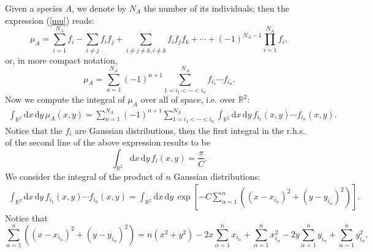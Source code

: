 \documentclass[12pt]{article}
\newcommand{\xd}{\mathrm{d}}
\numberwithin{equation}{section} %
\numberwithin{figure}{section} %
\theoremstyle{definition}
\begin{document}
Given a species $A$, we denote by $N_A$ the number of its individuals; then the expression (\ref{mu}) reads:
\begin{equation}
\mu_A = \sum_{i=1}^{N_A} f_{i} - \sum_{i \neq j} f_{i} f_{j} + \sum_{i \neq j \neq k,  i \neq k } f_{i} f_{j} f_{k} + \cdots + (-1)^{N_A-1} \prod_{i=1}^{N_A} f_i,
\end{equation}
or, in more compact notation,
\begin{equation}
\mu_A = \sum_{n=1}^{N_A} (-1)^{n+1} \sum_{ 1=i_1< \cdots <i_n }^{N_A} f_{i_1} \cdots f_{i_n}.
\end{equation}
Now we compute the integral of $\mu_A$ over all of space, i.e. over ${\mathbb R}^2$:
\begin{align}
\int_{{\mathbb R}^2} \xd x \, \xd y \, \mu_A(x,y)
= \sum_{n=1}^{N_A} (-1)^{n+1} \sum_{ 1=i_1< \cdots <i_n }^{N_A} \int_{{\mathbb R}^2} \xd x \, \xd y \,  f_{i_1} (x,y)\cdots f_{i_n} (x,y).
\end{align}
Notice that the $f_i$ are Gaussian distributions, then the first integral in the r.h.s. of the second line of the above expression results to be
\begin{equation}
\int_{{\mathbb R}^2} \xd x \, \xd y \, f_{i}(x,y) = \frac{\pi}{C}.
\end{equation}
We consider the integral of the product of $n$ Gaussian distributions:
\begin{align}
\int_{{\mathbb R}^2} \xd x \, \xd y \,  f_{i_1} (x,y)\cdots f_{i_n} (x,y) = \int_{{\mathbb R}^2} \xd x \, \xd y \,  \exp \left[ -C \sum_{\alpha=1}^n \left( (x-x_{i_{\alpha}})^2 + (y-y_{i_{\alpha}})^2 \right) \right].
\end{align}
Notice that 
\begin{equation}
\sum_{\alpha=1}^n  \left( (x-x_{i_{\alpha}})^2 +(y-y_{i_{\alpha}})^2 \right) = n (x^2+y^2) -2x  \sum_{\alpha=1}^n x_{i_{\alpha}} + \sum_{\alpha=1}^n x_{i_{\alpha}}^2 -2y \sum_{\alpha=1}^n y_{i_{\alpha}} + \sum_{\alpha=1}^n y_{i_{\alpha}}^2.
\end{equation}
\end{document}
